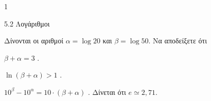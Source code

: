 \begin{ylh}{1}
\item 5.2 Λογάριθμοι
\end{ylh}
Δίνονται οι αριθμοί $\alpha = \log 20$ και $\beta = \log 50$. Να αποδείξετε ότι
\begin{alist}
\item $\beta + \alpha = 3$ .
\item $\ln(\beta + \alpha) > 1$ .
\item $10^\beta - 10^\alpha = 10 \cdot (\beta + \alpha)$ .
Δίνεται ότι $e \simeq 2,71$.
\end{alist}

